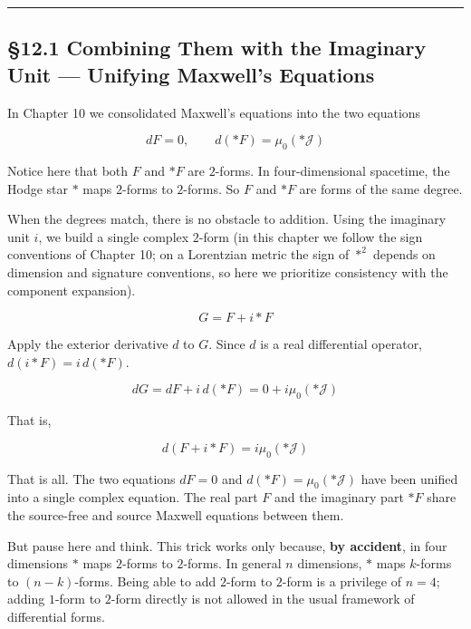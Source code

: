 \begin{center}\rule{0.5\linewidth}{0.5pt}\end{center}

\hypertarget{combining-them-with-the-imaginary-unit-unifying-maxwells-equations}{%
\subsection{§12.1 Combining Them with the Imaginary Unit --- Unifying
Maxwell's
Equations}\label{combining-them-with-the-imaginary-unit-unifying-maxwells-equations}}

In Chapter 10 we consolidated Maxwell's equations into the two equations

\[dF = 0, \qquad d(\ast F) = \mu_0(\ast\mathcal{J})\]

Notice here that both \(F\) and \(\ast F\) are \(2\)-forms. In
four-dimensional spacetime, the Hodge star \(\ast\) maps \(2\)-forms to
\(2\)-forms. So \(F\) and \(\ast F\) are forms of the same degree.

When the degrees match, there is no obstacle to addition. Using the
imaginary unit \(i\), we build a single complex \(2\)-form (in this
chapter we follow the sign conventions of Chapter 10; on a Lorentzian
metric the sign of \(\ast^2\) depends on dimension and signature
conventions, so here we prioritize consistency with the component
expansion).

\[G = F + i\ast F\]

Apply the exterior derivative \(d\) to \(G\). Since \(d\) is a real
differential operator, \(d(i\ast F) = i\,d(\ast F)\).

\[dG = dF + i\,d(\ast F) = 0 + i\mu_0(\ast\mathcal{J})\]

That is,

\[d(F + i\ast F) = i\mu_0(\ast\mathcal{J})\]

That is all. The two equations \(dF=0\) and
\(d(\ast F)=\mu_0(\ast\mathcal{J})\) have been unified into a single
complex equation. The real part \(F\) and the imaginary part \(\ast F\)
share the source-free and source Maxwell equations between them.

But pause here and think. This trick works only because, \textbf{by
accident}, in four dimensions \(\ast\) maps \(2\)-forms to \(2\)-forms.
In general \(n\) dimensions, \(\ast\) maps \(k\)-forms to
\((n-k)\)-forms. Being able to add \(2\)-form to \(2\)-form is a
privilege of \(n=4\); adding \(1\)-form to \(2\)-form directly is not
allowed in the usual framework of differential forms.

